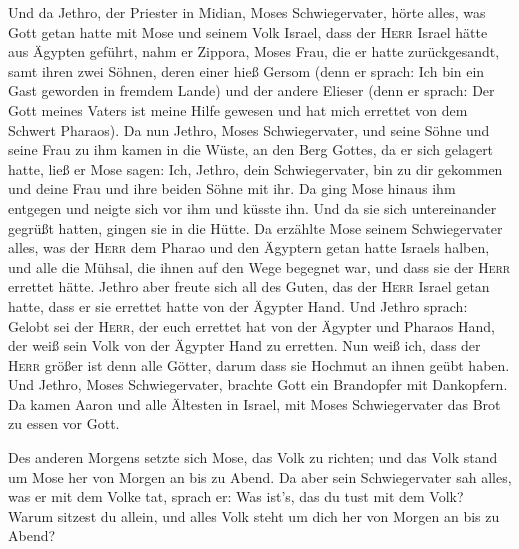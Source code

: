  Und da Jethro, der Priester in Midian, Moses
Schwiegervater, hörte alles, was Gott getan hatte mit Mose und seinem
Volk Israel, dass der \textsc{Herr} Israel hätte aus Ägypten geführt,
 nahm er Zippora, Moses Frau, die er hatte zurückgesandt,
 samt ihren zwei Söhnen, deren einer hieß Gersom (denn er
sprach: Ich bin ein Gast geworden in fremdem Lande)  und
der andere Elieser (denn er sprach: Der Gott meines Vaters ist meine
Hilfe gewesen und hat mich errettet von dem Schwert Pharaos).
 Da nun Jethro, Moses Schwiegervater, und seine Söhne und
seine Frau zu ihm kamen in die Wüste, an den Berg Gottes, da er sich
gelagert hatte,  ließ er Mose sagen: Ich, Jethro, dein
Schwiegervater, bin zu dir gekommen und deine Frau und ihre beiden Söhne
mit ihr.  Da ging Mose hinaus ihm entgegen und neigte sich
vor ihm und küsste ihn. Und da sie sich untereinander gegrüßt hatten,
gingen sie in die Hütte.  Da erzählte Mose seinem
Schwiegervater alles, was der \textsc{Herr} dem Pharao und den Ägyptern
getan hatte Israels halben, und alle die Mühsal, die ihnen auf den Wege
begegnet war, und dass sie der \textsc{Herr} errettet hätte.
 Jethro aber freute sich all des Guten, das der
\textsc{Herr} Israel getan hatte, dass er sie errettet hatte von der
Ägypter Hand.  Und Jethro sprach: Gelobt sei der
\textsc{Herr}, der euch errettet hat von der Ägypter und Pharaos Hand,
der weiß sein Volk von der Ägypter Hand zu erretten.  Nun
weiß ich, dass der \textsc{Herr} größer ist denn alle Götter, darum dass
sie Hochmut an ihnen geübt haben.  Und Jethro, Moses
Schwiegervater, brachte Gott ein Brandopfer mit Dankopfern. Da kamen
Aaron und alle Ältesten in Israel, mit Moses Schwiegervater das Brot zu
essen vor Gott.

 Des anderen Morgens setzte sich Mose, das Volk zu
richten; und das Volk stand um Mose her von Morgen an bis zu Abend.
 Da aber sein Schwiegervater sah alles, was er mit dem
Volke tat, sprach er: Was ist's, das du tust mit dem Volk? Warum sitzest
du allein, und alles Volk steht um dich her von Morgen an bis zu Abend?

